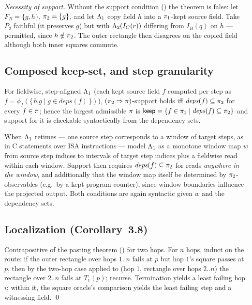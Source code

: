 \emph{Necessity of support.} Without the support condition
() the theorem is
false: let $F_B = \{g, h\}$, $\pi_2 = \{g\}$, and let $\Lambda_1$ copy
field $h$ into a $\pi_1$-kept source field. Take $P_2$ faithful (it
preserves $g$) but with $\Lambda_2(I_C(r))$ differing from $I_B(q)$ on
$h$ --- permitted, since $h \notin \pi_2$. The outer rectangle then
disagrees on the copied field although both inner squares commute.

\subsection{Composed keep-set, and step granularity}

For fieldwise, step-aligned $\Lambda_1$ (each kept source field $f$
computed per step as $f = \phi_f(\{\,b.g \mid g \in \mathit{deps}(f)\,\})$),
$(\pi_2 \Rightarrow \pi)$-support holds iff
$\mathit{deps}(f) \subseteq \pi_2$ for every $f \in \pi$; hence the
largest admissible $\pi$ is
$\mathsf{keep} = \{ f \in \pi_1 \mid \mathit{deps}(f) \subseteq \pi_2 \}$ and
support for it is checkable syntactically from the dependency sets.

When $\Lambda_1$ retimes --- one source step corresponds to a window of
target steps, as in C statements over ISA instructions --- model
$\Lambda_1$ as a monotone window map $w$ from source step indices to
intervals of target step indices plus a fieldwise read within each
window. Support then requires $\mathit{deps}(f) \subseteq \pi_2$ for
reads \emph{anywhere in the window}, and additionally that the window map
itself be determined by $\pi_2$-observables (e.g.\ by a kept program
counter), since window boundaries influence the projected output. Both
conditions are again syntactic given $w$ and the dependency sets.

\subsection{Localization (Corollary~3.8)}

Contrapositive of the pasting theorem () for two
hops. For $n$ hops, induct
on the route: if the outer rectangle over hops $1..n$ fails at $p$ but
hop $1$'s square passes at $p$, then by the two-hop case applied to
(hop 1, rectangle over hops $2..n$) the rectangle over $2..n$ fails at
$T_1(p)$; recurse. Termination yields a least failing hop $i$; within
it, the square oracle's comparison yields the least failing step and a
witnessing field. \qed

